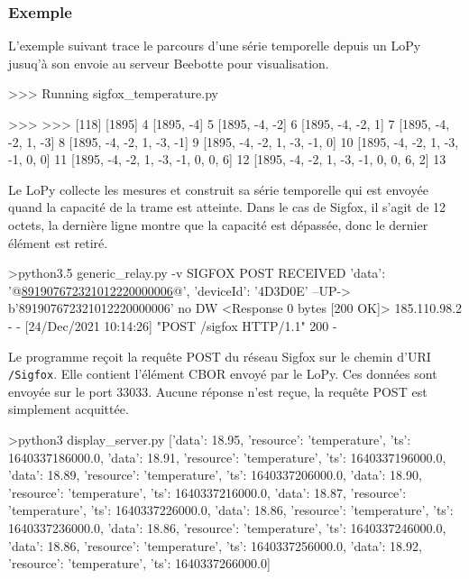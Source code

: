 \subsubsection{Exemple}
 
L'exemple suivant trace le parcours d'une série temporelle depuis un LoPy jusuq'à son envoie au serveur Beebotte pour visualisation.

\begin{termc}[backgroundcolor=\color{gray!10}, basicstyle=\ttfamily\small, escapechar=@] 
>>> Running sigfox_temperature.py

>>>
>>>
[118]
[1895] 4
[1895, -4] 5
[1895, -4, -2] 6
[1895, -4, -2, 1] 7
[1895, -4, -2, 1, -3] 8
[1895, -4, -2, 1, -3, -1] 9
[1895, -4, -2, 1, -3, -1, 0] 10
[1895, -4, -2, 1, -3, -1, 0, 0] 11
[1895, -4, -2, 1, -3, -1, 0, 0, 6] 12
[1895, -4, -2, 1, -3, -1, 0, 0, 6, 2] 13
\end{termc}

Le LoPy collecte les mesures et construit sa série temporelle qui est envoyée quand la capacité de la trame est atteinte. Dans le cas de Sigfox, il s'agit de 12 octets, la dernière ligne montre que la capacité est dépassée, donc le dernier élément est retiré.

\begin{termc}[backgroundcolor=\color{palerod}, basicstyle=\ttfamily\small, escapechar=@] 
 >python3.5 generic_relay.py -v
SIGFOX POST RECEIVED
{'data': '@\ul{891907672321012220000006}@', 'deviceId': '4D3D0E'}
--UP-> b'891907672321012220000006'
no DW
<Response 0 bytes [200 OK]>
185.110.98.2 - - [24/Dec/2021 10:14:26] "POST /sigfox HTTP/1.1" 200 -
\end{termc}

Le programme  reçoit la requête POST du réseau Sigfox sur le chemin d'URI \texttt{/Sigfox}. Elle contient l'élément CBOR envoyé par le LoPy. Ces données sont envoyée sur le port 33033. Aucune réponse n'est reçue, la requête POST est simplement acquittée.


\begin{termc}[backgroundcolor=\color{palerod}, basicstyle=\ttfamily\small, escapechar=@] 
 >python3 display_server.py
[{'data': 18.95, 'resource': 'temperature', 'ts': 1640337186000.0},
 {'data': 18.91, 'resource': 'temperature', 'ts': 1640337196000.0},
 {'data': 18.89, 'resource': 'temperature', 'ts': 1640337206000.0},
 {'data': 18.90, 'resource': 'temperature', 'ts': 1640337216000.0},
 {'data': 18.87, 'resource': 'temperature', 'ts': 1640337226000.0},
 {'data': 18.86, 'resource': 'temperature', 'ts': 1640337236000.0},
 {'data': 18.86, 'resource': 'temperature', 'ts': 1640337246000.0},
 {'data': 18.86, 'resource': 'temperature', 'ts': 1640337256000.0},
 {'data': 18.92, 'resource': 'temperature', 'ts': 1640337266000.0}]
\end{termc}

